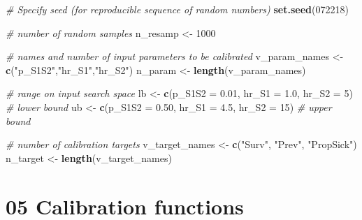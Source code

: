 \documentclass[
]{article}
\newenvironment{Shaded}{\begin{snugshade}}{\end{snugshade}}
\newcommand{\CommentTok}[1]{\textcolor[rgb]{0.56,0.35,0.01}{\textit{#1}}}
\newcommand{\DataTypeTok}[1]{\textcolor[rgb]{0.13,0.29,0.53}{#1}}
\newcommand{\DecValTok}[1]{\textcolor[rgb]{0.00,0.00,0.81}{#1}}
\newcommand{\FloatTok}[1]{\textcolor[rgb]{0.00,0.00,0.81}{#1}}
\newcommand{\KeywordTok}[1]{\textcolor[rgb]{0.13,0.29,0.53}{\textbf{#1}}}
\newcommand{\NormalTok}[1]{#1}
\newcommand{\StringTok}[1]{\textcolor[rgb]{0.31,0.60,0.02}{#1}}
\begin{document}
\begin{Shaded}
\begin{Highlighting}[]
\CommentTok{# Specify seed (for reproducible sequence of random numbers)}
\KeywordTok{set.seed}\NormalTok{(}\DecValTok{072218}\NormalTok{)}

\CommentTok{# number of random samples}
\NormalTok{n_resamp <-}\StringTok{ }\DecValTok{1000}

\CommentTok{# names and number of input parameters to be calibrated}
\NormalTok{v_param_names <-}\StringTok{ }\KeywordTok{c}\NormalTok{(}\StringTok{"p_S1S2"}\NormalTok{,}\StringTok{"hr_S1"}\NormalTok{,}\StringTok{"hr_S2"}\NormalTok{)}
\NormalTok{n_param <-}\StringTok{ }\KeywordTok{length}\NormalTok{(v_param_names)}

\CommentTok{# range on input search space}
\NormalTok{lb <-}\StringTok{ }\KeywordTok{c}\NormalTok{(}\DataTypeTok{p_S1S2 =} \FloatTok{0.01}\NormalTok{, }\DataTypeTok{hr_S1 =} \FloatTok{1.0}\NormalTok{, }\DataTypeTok{hr_S2 =} \DecValTok{5}\NormalTok{)  }\CommentTok{# lower bound}
\NormalTok{ub <-}\StringTok{ }\KeywordTok{c}\NormalTok{(}\DataTypeTok{p_S1S2 =} \FloatTok{0.50}\NormalTok{, }\DataTypeTok{hr_S1 =} \FloatTok{4.5}\NormalTok{, }\DataTypeTok{hr_S2 =} \DecValTok{15}\NormalTok{) }\CommentTok{# upper bound}

\CommentTok{# number of calibration targets}
\NormalTok{v_target_names <-}\StringTok{ }\KeywordTok{c}\NormalTok{(}\StringTok{"Surv"}\NormalTok{, }\StringTok{"Prev"}\NormalTok{, }\StringTok{"PropSick"}\NormalTok{)}
\NormalTok{n_target <-}\StringTok{ }\KeywordTok{length}\NormalTok{(v_target_names)}
\end{Highlighting}
\end{Shaded}

\hypertarget{calibration-functions}{%
\section{05 Calibration functions}\label{calibration-functions}}
\end{document}

